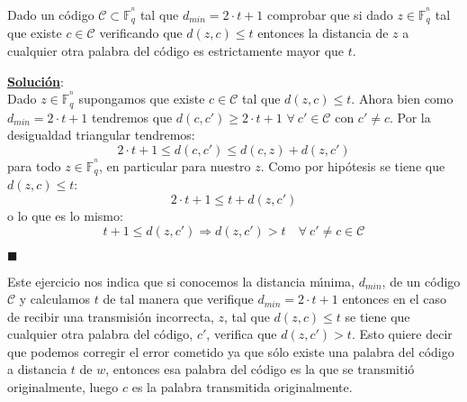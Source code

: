 %
%

\begin{ejercicio}
Dado un c\'odigo $\mathcal{C}\subset \mathbb{F}^{^n}_q$ tal que
$d_{min} = 2\cdot t + 1$ comprobar que si dado
$z\in \mathbb{F}^{^n}_q$ tal que existe $c\in \mathcal{C}$ verificando que
$d(z,c)\leq t$ entonces la distancia de $z$ a cualquier otra palabra del
c\'odigo es estrictamente mayor que $t$.
\end{ejercicio}
\underline{\textbf{Soluci\'on}}:\\
Dado $z\in \mathbb{F}^{^n}_q$ supongamos que existe $c\in \mathcal{C}$ tal que
$d(z,c)\leq t$. Ahora bien como $d_{min} = 2\cdot t+1$ tendremos que
$d(c,c')\geq 2\cdot t+1$ $\forall \ c'\in \mathcal{C}$ con $c'\neq c$.
Por la desigualdad triangular tendremos:
\begin{displaymath}
2\cdot t+1 \leq d(c,c')\leq d(c,z)+d(z,c')
\end{displaymath}
para todo $z\in \mathbb{F}^{^n}_q$, en particular para nuestro $z$. Como por
hip\'otesis se tiene que $d(z,c)\leq t$:
\begin{displaymath}
2\cdot t +1 \leq t + d(z,c')
\end{displaymath}
o lo que es lo mismo:
\begin{displaymath}
t + 1 \leq d(z,c') \Longrightarrow d(z,c') > t\quad \forall \ c'\neq c \in \mathcal{C}
\end{displaymath}
\begin{flushright}
$\blacksquare$
\end{flushright}

Este ejercicio nos indica que si conocemos la distancia m\'{\i}nima, $d_{min}$,
de un c\'odigo $\mathcal{C}$ y calculamos $t$ de tal manera que verifique
$d_{min} = 2\cdot t +1$ entonces en el caso de recibir una transmisi\'on 
incorrecta, $z$, tal que $d(z,c)\leq t$ se tiene que cualquier otra palabra del
c\'odigo, $c'$, verifica que $d(z,c')> t$. Esto quiere decir que podemos
corregir el error cometido ya que s\'olo existe una palabra del c\'odigo
a distancia $t$ de $w$, entonces esa palabra del c\'odigo es la que se
transmiti\'o originalmente, luego $c$ es la palabra transmitida originalmente.

%
% 

